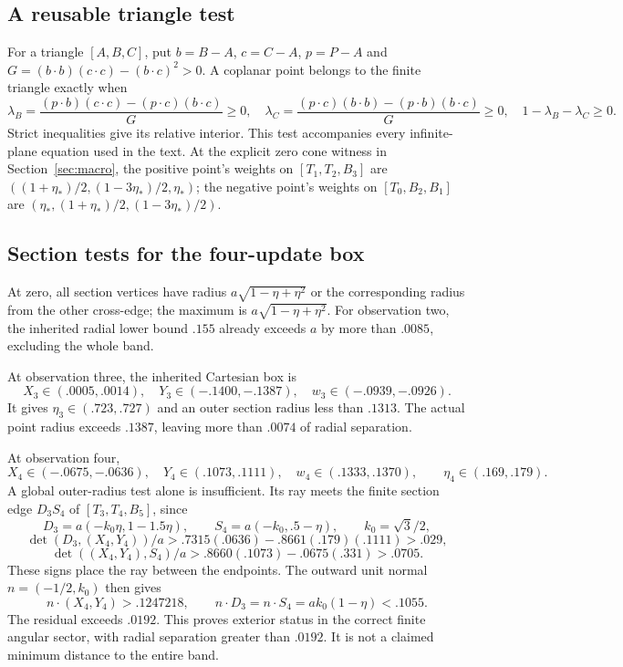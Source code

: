 \documentclass[11pt,a4paper]{article}
\numberwithin{equation}{section}
\begin{document}
\subsection{A reusable triangle test}
For a triangle $[A,B,C]$, put $b=B-A$, $c=C-A$, $p=P-A$ and
$G=(b\cdot b)(c\cdot c)-(b\cdot c)^2>0$. A coplanar point belongs to
the finite triangle exactly when
\[
\lambda_B=\frac{(p\cdot b)(c\cdot c)-(p\cdot c)(b\cdot c)}G\geq0,\quad
\lambda_C=\frac{(p\cdot c)(b\cdot b)-(p\cdot b)(b\cdot c)}G\geq0,\quad
1-\lambda_B-\lambda_C\geq0.
\]
Strict inequalities give its relative interior. This test accompanies
every infinite-plane equation used in the text. At the explicit zero
cone witness in Section~\ref{sec:macro}, the positive point's weights on
$[T_1,T_2,B_3]$ are
$((1+\eta_*)/2,(1-3\eta_*)/2,\eta_*)$; the negative point's weights on
$[T_0,B_2,B_1]$ are
$(\eta_*,(1+\eta_*)/2,(1-3\eta_*)/2)$.

\subsection{Section tests for the four-update box}
At zero, all section vertices have radius
$a\sqrt{1-\eta+\eta^2}$ or the corresponding radius from the other
cross-edge; the maximum is $a\sqrt{1-\eta+\eta^2}$.
For observation two, the inherited radial lower bound $.155$ already exceeds
$a$ by more than $.0085$, excluding the whole band.

At observation three, the inherited Cartesian box is
\[
X_3\in(.0005,.0014),\quad Y_3\in(-.1400,-.1387),\quad
w_3\in(-.0939,-.0926).
\]
It gives $\eta_3\in(.723,.727)$ and an outer section radius less than
$.1313$. The actual point radius exceeds $.1387$, leaving more than
$.0074$ of radial separation.

At observation four,
\[
X_4\in(-.0675,-.0636),\quad Y_4\in(.1073,.1111),\quad
w_4\in(.1333,.1370),\qquad \eta_4\in(.169,.179).
\]
A global outer-radius test alone is insufficient. Its ray meets the finite
section edge $D_3S_4$ of $[T_3,T_4,B_5]$, since
\[
D_3=a(-k_0\eta,1-1.5\eta),\qquad
S_4=a(-k_0,.5-\eta),\qquad k_0=\sqrt3/2,
\]
\[
\det(D_3,(X_4,Y_4))/a
>.7315(.0636)-.8661(.179)(.1111)>.029,
\]
\[
\det((X_4,Y_4),S_4)/a
>.8660(.1073)-.0675(.331)>.0705.
\]
These signs place the ray between the endpoints. The outward unit normal
$n=(-1/2,k_0)$ then gives
\[
n\cdot(X_4,Y_4)>.1247218,\qquad
n\cdot D_3=n\cdot S_4=ak_0(1-\eta)<.1055.
\]
The residual exceeds $.0192$. This proves exterior status in the correct
finite angular sector, with radial separation greater than $.0192$.
It is not a claimed minimum distance to the entire band.
\end{document}
